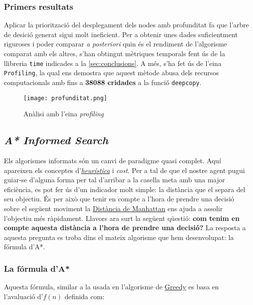 \documentclass{article}
\begin{document}
\subsubsection{Primers resultats}

Aplicar la priorització del desplegament dels nodes amb profunditat fa que l'arbre de desició generat sigui molt ineficient. Per a obtenir unes dades suficientment riguroses i poder comparar \textit{a posteriori} quin és el rendiment de l'algorisme comparat amb els altres, s'han obtingut mètriques temporals fent ús de la llibreria \verb|time| indicades a la \autoref{sec:conclusions}. A més, s'ha fet ús de l'eina \verb|Profiling|, la qual ens demostra que aquest mètode abusa dels recursos computacionals amb fins a \textbf{38088 cridades} a la funció \verb|deepcopy|. 

\begin{figure}[h]
    \centering
    \texttt{[image: profunditat.png]}
    \caption{Anàlisi amb l'eina \textit{profiling}}
    \label{fig:profunditat-profiling}
\end{figure}

\subsection{\textit{A* Informed Search}}
Els algorismes informats són un canvi de paradigme quasi complet. Aquí apareixen els conceptes d'\href{https://en.wikipedia.org/wiki/Heuristic}{\textit{heurística}} i \textit{cost}. Per a tal de que el nostre agent pugui guiar-se d'alguna forma per tal d'arribar a la casella meta amb una major eficiència, es pot fer ús d'un indicador molt simple: la distància que el separa del seu objectiu. És per això que tenir en compte a l'hora de prendre una decisió sobre el següent moviment la \href{https://en.wikipedia.org/wiki/Taxicab_geometry}{Distància de Manhattan} ens ajuda a assolir l'objectiu més ràpidament. Llavors ara surt la següent qüestió: \textbf{com tenim en compte aquesta distància a l'hora de prendre una decisió?} La resposta a aquesta pregunta es troba dins el mateix algorisme que hem desenvolupat: la fórmula d'A*. 

\subsubsection{La fórmula d'A*}

Aquesta fórmula, similar a la usada en l'algorisme de \href{https://en.wikipedia.org/wiki/Greedy_algorithm}{Greedy} es basa en l'avaluació d'\( f(n) \) definida com:
\end{document}
